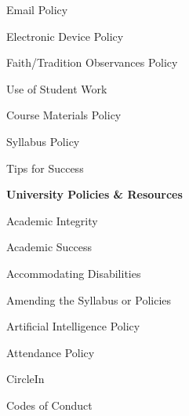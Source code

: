 \documentclass[11pt,letterpaper]{article}
\begin{document}
\begin{minipage}[t]{0.45\textwidth}
\hspace{0.3cm} Email Policy \dotfill \pageref{email_policy} \par 
\hspace{0.3cm} Electronic Device Policy \dotfill \pageref{electronic} \par
\hspace{0.3cm} Faith/Tradition Observances Policy \dotfill \pageref{faith} \par
\hspace{0.3cm} Use of Student Work \dotfill \pageref{std_work} \par
\hspace{0.3cm} Course Materials Policy \dotfill \pageref{copyright} \par
\end{minipage} \hfill \begin{minipage}[t]{0.45\textwidth} \par %
\hspace{0.3cm} Syllabus Policy \dotfill \pageref{syllabus} \par
\hspace{0.3cm} Tips for Success \dotfill \pageref{tips} \par
{\bfseries\color{scred} University Policies \& Resources} \dotfill \pageref{univ_policies} \par
\hspace{0.3cm} Academic Integrity \dotfill \pageref{univ_academicintegrity} \par
\hspace{0.3cm} Academic Success \dotfill \pageref{univ_success} \par
\hspace{0.3cm} Accommodating Disabilities \dotfill \pageref{univ_ada} \par
\hspace{0.3cm} Amending the Syllabus or Policies \dotfill \pageref{univ_amending} \par
\hspace{0.3cm} Artificial Intelligence Policy \dotfill \pageref{univ_artintel} \par
\hspace{0.3cm} Attendance Policy \dotfill \pageref{univ_attendance} \par
\hspace{0.3cm} CircleIn \dotfill \pageref{circlein} \par
\hspace{0.3cm} Codes of Conduct \dotfill \pageref{univ_conduct} \par

\end{minipage}
\end{document}
